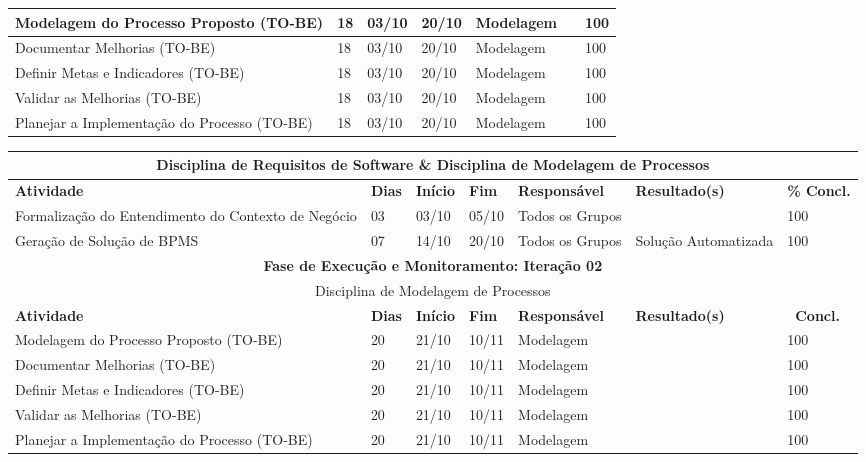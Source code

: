 \begin{landscape}
\begin{center}
\begin{tabular}{|m{6cm}|m{1cm}|m{1cm}|m{1cm}|m{4cm}|m{6cm}|m{2cm}|}
			Modelagem do Processo Proposto (TO-BE) & 18 & 03/10 & 20/10 & Modelagem & & 100 \\ \hline
			Documentar Melhorias (TO-BE) & 18 & 03/10 & 20/10 & Modelagem & & 100 \\ \hline
			Definir Metas e Indicadores (TO-BE) & 18 & 03/10 & 20/10 & Modelagem & & 100 \\ \hline
			Validar as Melhorias (TO-BE) & 18 & 03/10 & 20/10 & Modelagem & & 100 \\ \hline
			Planejar a Implementação do Processo (TO-BE) & 18 & 03/10 & 20/10 & Modelagem & & 100 \\ \hline
			\end{tabular}
		\end{center}
		\begin{center}
			\begin{tabular}{|m{6cm}|m{1cm}|m{1cm}|m{1cm}|m{4cm}|m{6cm}|m{2cm}|}
			\hline
			\multicolumn{7}{|c|}{Disciplina de Requisitos de Software \& Disciplina de Modelagem de Processos} \\ \hline
			\textbf{Atividade} & \textbf{Dias} & \textbf{Início} & \textbf{Fim} & \textbf{Responsável} & \textbf{Resultado(s)} & \textbf{\% Concl.} \\ \hline
			Formalização do Entendimento do Contexto de Negócio & 03 & 03/10 & 05/10 & Todos os Grupos & & 100 \\ \hline
			Geração de Solução de BPMS & 07 & 14/10 & 20/10 & Todos os Grupos & Solução Automatizada & 100 \\ \hline
			\multicolumn{7}{|c|}{\textbf{Fase de Execução e Monitoramento: Iteração 02}} \\
			\hline
			\multicolumn{7}{|c|}{Disciplina de Modelagem de Processos} \\
			\hline
			\textbf{Atividade} & \textbf{Dias} & \textbf{Início} & \textbf{Fim} & \textbf{Responsável} & \textbf{Resultado(s)} & \textbf{\ Concl.} \\ \hline
			Modelagem do Processo Proposto (TO-BE) & 20 & 21/10 & 10/11 & Modelagem & & 100 \\ \hline
			Documentar Melhorias (TO-BE) & 20 & 21/10 & 10/11 & Modelagem & & 100 \\ \hline
			Definir Metas e Indicadores (TO-BE) & 20 & 21/10 & 10/11 & Modelagem & & 100 \\ \hline
			Validar as Melhorias (TO-BE) & 20 & 21/10 & 10/11 & Modelagem & & 100 \\ \hline
			Planejar a Implementação do Processo (TO-BE) & 20 & 21/10 & 10/11 & Modelagem & & 100 \\ \hline

\end{tabular}
\end{center}
\end{landscape}
